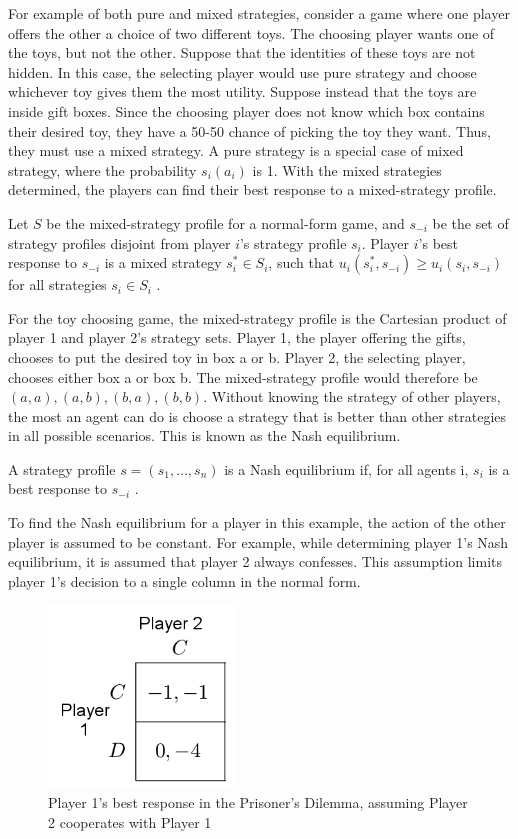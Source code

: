 For example of both pure and mixed strategies, consider a game where one player offers the other a choice of two different toys. The choosing player wants one of the toys, but not the other. Suppose that the identities of these toys are not hidden. In this case, the selecting player would use pure strategy and choose whichever toy gives them the most utility. Suppose instead that the toys are inside gift boxes. Since the choosing player does not know which box contains their desired toy, they have a 50-50 chance of picking the toy they want. Thus, they must use a mixed strategy. A pure strategy is a special case of mixed strategy, where the probability $s_i(a_i)$ is 1. With the mixed strategies determined, the players can find their best response to a mixed-strategy profile.

\begin{define}
  Let $S$ be the mixed-strategy profile for a normal-form game, and $s_{-i}$ be the set of strategy profiles disjoint from player $i$'s strategy profile $s_i$. Player $i$'s best response to $s_{-i}$ is a mixed strategy $s_i^*\in S_i$, such that $u_i(s_i^*,s_{-i}) \ge u_i(s_i, s_{-i})$ for all strategies $s_i\in S_i$ \cite{shoh09}.
\end{define}

For the toy choosing game, the mixed-strategy profile is the Cartesian product of player 1 and player 2's strategy sets. Player 1, the player offering the gifts, chooses to put the desired toy in box a or b. Player 2, the selecting player, chooses either box a or box b. The mixed-strategy profile would therefore be $(a, a), (a, b), (b, a), (b, b)$. Without knowing the strategy of other players, the most an agent can do is choose a strategy that is better than other strategies in all possible scenarios. This is known as the Nash equilibrium.

\begin{define}
  A strategy profile $s=(s_1,\dots ,s_n)$ is a Nash equilibrium if, for all agents i, $s_i$ is a best response to $s_{-i}$ \cite{shoh09}.
\end{define}

To find the Nash equilibrium for a player in this example, the action of the other player is assumed to be constant. For example, while determining player 1's Nash equilibrium, it is assumed that player 2 always confesses. This assumption limits player 1's decision to a single column in the normal form.
\begin{figure}[H]
  \centering
  \includegraphics[width=5cm]{figures/ExamplePartialGrid1.png}
  \caption{Player 1's best response in the Prisoner's Dilemma, assuming Player 2 cooperates with Player 1}
  \label{fig:NashCol1}
\end{figure}

